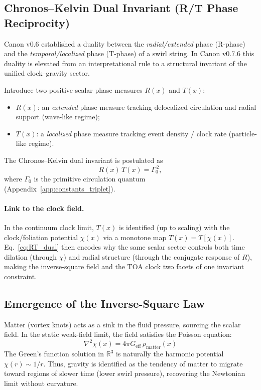 \documentclass[10pt]{article}
\begin{document}
    
    \subsection{Chronos--Kelvin Dual Invariant (R/T Phase Reciprocity)}
    \label{sec:chronos_kelvin_dual}

    Canon v0.6 established a duality between the \emph{radial/extended} phase (R-phase)
    and the \emph{temporal/localized} phase (T-phase) of a swirl string.
    In Canon v0.7.6 this duality is elevated from an interpretational rule to a
    structural invariant of the unified clock--gravity sector.

    Introduce two positive scalar phase measures $R(x)$ and $T(x)$:
    \begin{itemize}
        \item $R(x)$: an \emph{extended} phase measure tracking delocalized circulation
        and radial support (wave-like regime);
        \item $T(x)$: a \emph{localized} phase measure tracking event density / clock rate
        (particle-like regime).
    \end{itemize}
    The Chronos--Kelvin dual invariant is postulated as
    \begin{equation}
        R(x)\,T(x)=\Gamma_0^{\,2},
        \label{eq:RT_dual}
    \end{equation}
    where $\Gamma_0$ is the primitive circulation quantum (Appendix~\ref{app:constants_triplet}).

    \paragraph{Link to the clock field.}
    In the continuum clock limit, $T(x)$ is identified (up to scaling) with the
    clock/foliation potential $\chi(x)$ via a monotone map $T(x)=T[\chi(x)]$.
    Eq.~\eqref{eq:RT_dual} then encodes why the same scalar sector controls both
    time dilation (through $\chi$) and radial structure (through the conjugate
    response of $R$), making the inverse-square field and the TOA clock two facets
    of one invariant constraint.

\subsection{Emergence of the Inverse-Square Law}
        Matter (vortex knots) acts as a sink in the fluid pressure, sourcing the scalar field. In the static weak-field limit, the field satisfies the Poisson equation:
        \begin{equation}
            \nabla^2 \chi(x) = 4\pi G_{\text{eff}} \, \rho_{\text{matter}}(x)
        \end{equation}
        The Green's function solution in $\mathbb{R}^3$ is naturally the harmonic potential $\chi(r) \sim 1/r$. Thus, gravity is identified as the tendency of matter to migrate toward regions of slower time (lower swirl pressure), recovering the Newtonian limit without curvature.
\end{document}

